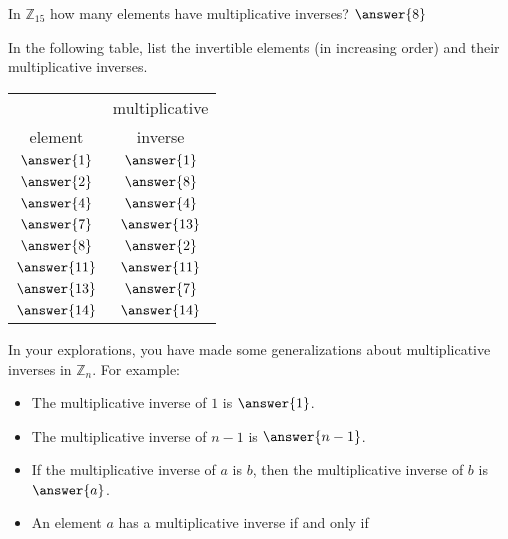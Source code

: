 \documentclass[space,nooutcomes,handout]{ximera}
\begin{document}
\begin{problem}
In $\mathbb{Z}_{15}$ how many elements have multiplicative inverses?   $\answer{8}$
\begin{problem} 
In the following table, list the invertible elements (in increasing order) and their multiplicative inverses. 
\begin{image}
\begin{tabular}{c | c}
\hline
              & multiplicative \\
element & inverse \\
\hline
$\answer{1}$ & $\answer{1}$ \\
$\answer{2}$ & $\answer{8}$ \\
$\answer{4}$ & $\answer{4}$ \\
$\answer{7}$ & $\answer{13}$ \\
$\answer{8}$ & $\answer{2}$ \\
$\answer{11}$ & $\answer{11}$ \\
$\answer{13}$ & $\answer{7}$ \\
$\answer{14}$ & $\answer{14}$ \\
\hline
\end{tabular}
\end{image}
\end{problem}
\end{problem}


\begin{problem}
In your explorations, you have made some generalizations about multiplicative inverses in $\mathbb{Z}_n$.  For example: 
\begin{itemize}
\item The multiplicative inverse of $1$ is $\answer{1}$. 
\item The multiplicative inverse of $n-1$ is $\answer{n-1}$. 
\item If the multiplicative inverse of $a$ is $b$, then the multiplicative inverse of $b$ is $\answer{a}$.  
\item An element $a$ has a multiplicative inverse if and only if 
\end{itemize}
\end{problem}
\end{document}
